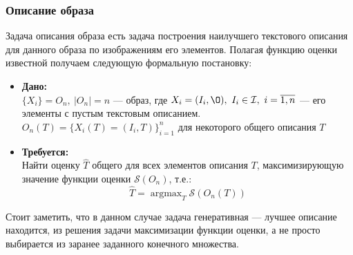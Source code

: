 \documentclass[a4paper,12pt]{article}
\DeclareMathOperator*{\argmax}{argmax}
\begin{document}
				\subsubsection{Описание образа}
				Задача описания образа есть задача построения наилучшего текстового описания для данного образа по изображениям его элементов. Полагая функцию оценки известной получаем следующую формальную постановку:\\
				\begin{itemize}
					\item \textbf{Дано:}\\
					$\{X_i\} = O_n, ~|O_n| = n$ --- образ, где $X_i = (I_i, \O),~I_i\in\mathcal{I},~i=\overline{1, n}$ --- его элементы с пустым текстовым описанием. \\
					$O_n(T) = \{X_i(T) = (I_i, T)\}_{i=1}^n$ для некоторого общего описания $T$\\
					\item \textbf{Требуется:}\\
					Найти оценку $\hat{T}$ общего для всех элементов описания $T$, максимизирующую значение функции оценки $\mathcal{S}(O_n)$, т.е.: \\
					$$\hat{T}= \argmax_{T}\mathcal{S}(O_n(T))$$
				\end{itemize}
				Стоит заметить, что в данном случае задача генеративная --- лучшее описание находится, из решения задачи максимизации функции оценки, а не просто выбирается из заранее заданного конечного множества.
				
			
\end{document}
